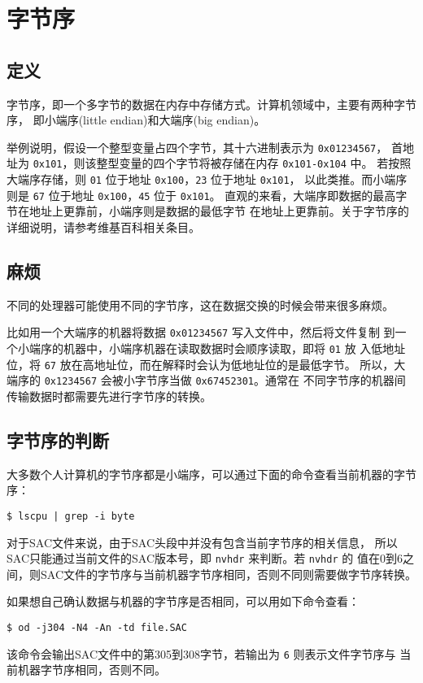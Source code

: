 \section{字节序}
\label{sec:endian}
\subsection{定义}
字节序，即一个多字节的数据在内存中存储方式。计算机领域中，主要有两种字节序，
即小端序(little endian)和大端序(big endian)。

举例说明，假设一个整型变量占四个字节，其十六进制表示为 \texttt{0x01234567}，
首地址为 \texttt{0x101}，则该整型变量的四个字节将被存储在内存 \texttt{0x101-0x104} 中。
若按照大端序存储，则 \texttt{01} 位于地址 \texttt{0x100}，\texttt{23} 位于地址 \texttt{0x101}，
以此类推。而小端序则是 \texttt{67} 位于地址 \texttt{0x100}，\texttt{45} 位于 \texttt{0x101}。
直观的来看，大端序即数据的最高字节在地址上更靠前，小端序则是数据的最低字节
在地址上更靠前。关于字节序的详细说明，请参考维基百科相关条目。

\subsection{麻烦}
不同的处理器可能使用不同的字节序，这在数据交换的时候会带来很多麻烦。

比如用一个大端序的机器将数据 \texttt{0x01234567} 写入文件中，然后将文件复制
到一个小端序的机器中，小端序机器在读取数据时会顺序读取，即将 \texttt{01} 放
入低地址位，将 \texttt{67} 放在高地址位，而在解释时会认为低地址位的是最低字节。
所以，大端序的 \texttt{0x1234567} 会被小字节序当做 \texttt{0x67452301}。通常在
不同字节序的机器间传输数据时都需要先进行字节序的转换。

\subsection{字节序的判断}
大多数个人计算机的字节序都是小端序，可以通过下面的命令查看当前机器的字节序：
\begin{verbatim}
$ lscpu | grep -i byte
\end{verbatim}

对于SAC文件来说，由于SAC头段中并没有包含当前字节序的相关信息，
所以SAC只能通过当前文件的SAC版本号，即 \texttt{nvhdr} 来判断。若 \texttt{nvhdr} 的
值在0到6之间，则SAC文件的字节序与当前机器字节序相同，否则不同则需要做字节序转换。

如果想自己确认数据与机器的字节序是否相同，可以用如下命令查看：
\begin{verbatim}
$ od -j304 -N4 -An -td file.SAC
\end{verbatim}
该命令会输出SAC文件中的第305到308字节，若输出为 \texttt{6} 则表示文件字节序与
当前机器字节序相同，否则不同。

